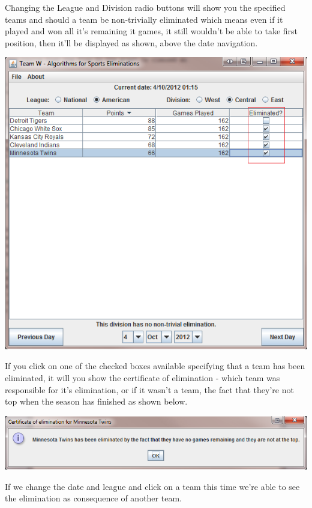 Changing the League and Division radio buttons will show you the specified teams and should a team be non-trivially eliminated which means even if it played and won all it's remaining it games, it still wouldn't be able to take first position, then it'll be displayed as shown, above the date navigation.

\includegraphics[width=\linewidth,keepaspectratio]{images/userManualDesk4.png}

If you click on one of the checked boxes available specifying that a team has been eliminated, it will you show the certificate of elimination - which team was responsible for it's elimination, or if it wasn't a team, the fact that they're not top when the season has finished as shown below.

\includegraphics[width=\linewidth,keepaspectratio]{images/userManualDesk5.png}

If we change the date and league and click on a team this time we're able to see the elimination as consequence of another team.


